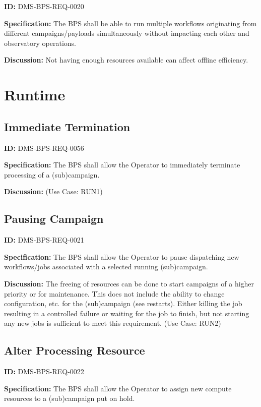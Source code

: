 \documentclass[SE,toc,lsstdraft]{lsstdoc}
\begin{document}
\label{DMS-BPS-REQ-0020}
\textbf{ID:} DMS-BPS-REQ-0020

\textbf{Specification:}
The BPS shall be able to run multiple workflows originating from different campaigns/payloads simultaneously without impacting each other and observatory operations.

\textbf{Discussion:}
Not having enough resources available can affect offline efficiency.

\section{Runtime}

\subsection{Immediate Termination}

\label{DMS-BPS-REQ-0056}
\textbf{ID:} DMS-BPS-REQ-0056

\textbf{Specification:}
The BPS shall allow the Operator to immediately terminate processing of a (sub)campaign.

\textbf{Discussion:}
(Use Case: RUN1)

\subsection{Pausing Campaign}

\label{DMS-BPS-REQ-0021}
\textbf{ID:} DMS-BPS-REQ-0021

\textbf{Specification:}
The BPS shall allow the Operator to pause dispatching new workflows/jobs associated with a selected running (sub)campaign.

\textbf{Discussion:}
The freeing of resources can be done to start campaigns of a higher priority or for maintenance. This does not include the ability to change configuration, etc. for the (sub)campaign (see restarts). Either killing the job resulting in a controlled failure or waiting for the job to finish, but not starting any new jobs is sufficient to meet this requirement.  (Use Case: RUN2)

\subsection{Alter Processing Resource}

\label{DMS-BPS-REQ-0022}
\textbf{ID:} DMS-BPS-REQ-0022

\textbf{Specification:}
The BPS shall allow the Operator to assign new compute resources to a (sub)campaign put on hold.
\end{document}
